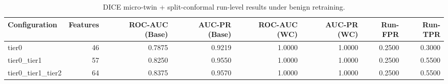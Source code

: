 \begin{table}[t]
\centering
\caption{DICE micro-twin + split-conformal run-level results under benign retraining.}
\label{tab:dice_full_overall}
\footnotesize
\begin{tabular}{lrrrrrrr}
\toprule
Configuration & Features & ROC-AUC (Base) & AUC-PR (Base) & ROC-AUC (WC) & AUC-PR (WC) & Run-FPR & Run-TPR \\
\midrule
tier0 & 46 & 0.7875 & 0.9219 & 1.0000 & 1.0000 & 0.2500 & 0.3000 \\
tier0_tier1 & 57 & 0.8250 & 0.9550 & 1.0000 & 1.0000 & 0.2500 & 0.5500 \\
tier0_tier1_tier2 & 64 & 0.8375 & 0.9570 & 1.0000 & 1.0000 & 0.2500 & 0.5500 \\
\bottomrule
\end{tabular}

\end{table}
